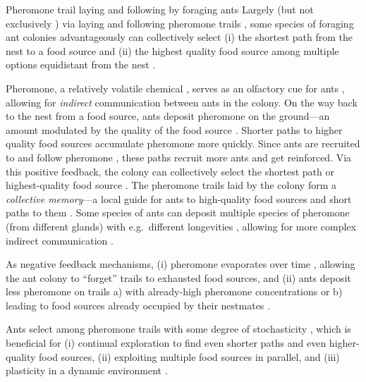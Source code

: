 \documentclass[11pt, oneside]{article}
\begin{document}
\begin{mybox}[label=box:ants, breakable]{Pheromone trail laying and following by foraging ants}
Largely (but not exclusively \cite{evison2008combined,czaczkes2015trail,robinson2005no}) via laying and following pheromone trails \cite{czaczkes2015trail}, 
some species of foraging ant colonies advantageously \cite{deneubourg1983probabilistic} can collectively select 
(i) the shortest path from the nest to a food source \cite{goss1989self}
and
(ii) the highest quality food source among multiple options equidistant from the nest \cite{beckers1993modulation}. 

Pheromone, a relatively volatile chemical \cite{david2009trail}, serves as an olfactory cue for ants \cite{knaden2016sensory}, allowing for \emph{indirect} communication between ants in the colony. 
On the way back to the nest from a food source, ants deposit pheromone on the ground---an amount modulated by the quality of the food source \cite{beckers1993modulation}.
Shorter paths to higher quality food sources accumulate pheromone more quickly.
Since ants are recruited to and follow pheromone \cite{beckers1993modulation,czaczkes2015trail}, these paths recruit more ants and get reinforced. Via this positive feedback, the colony can collectively select the shortest path or highest-quality food source \cite{jackson2006communication,czaczkes2015trail,bonabeau1999swarm}.
The pheromone trails laid by the colony form a \emph{collective memory}---a local guide for ants to high-quality food sources and short paths to them \cite{jackson2006communication}.
Some species of ants can deposit multiple species of pheromone (from different glands) with e.g.\ different longevities \cite{czaczkes2015trail}, allowing for more complex indirect communication \cite{jackson2006communication,robinson2005no}.

As negative feedback mechanisms, 
(i) pheromone evaporates over time \cite{jackson2006communication,david2009trail,van2011temperature}, allowing the ant colony to ``forget'' trails to exhausted food sources,
and 
(ii) ants deposit less pheromone on trails a) with already-high pheromone concentrations \cite{czaczkes2013ant} or b) leading to food sources already occupied by their nestmates \cite{wendt2020negative}.

Ants select among pheromone trails with some degree of stochasticity \cite{deneubourg1990self}, which is beneficial for 
(i) continual exploration to find even shorter paths and even higher-quality food sources, 
(ii) exploiting multiple food sources in parallel, 
and 
(iii) plasticity in a dynamic environment \cite{deneubourg1983probabilistic,shiraishi2019diverse,deneubourg1986random,dussutour2009noise,edelstein1995trail}.




\end{mybox}
\end{document}
